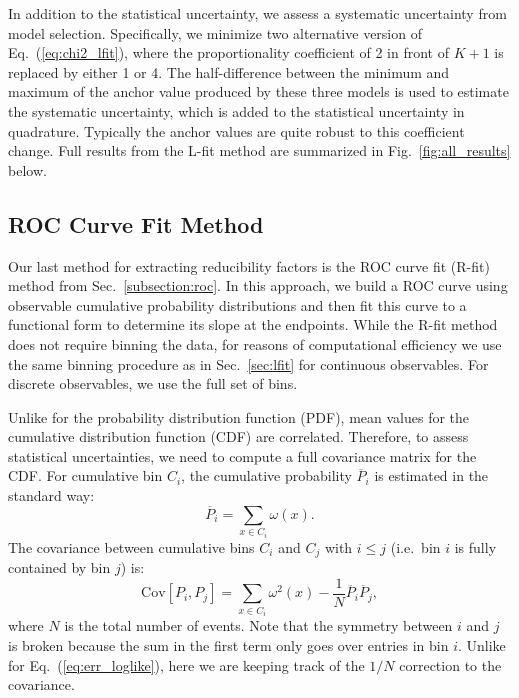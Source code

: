\documentclass[aps,prd,twocolumn,preprintnumbers,nofootinbib,longbibliography,floatfix]{revtex4-1}
\DeclareRobustCommand{\Sec}[1]{Sec.~\ref{#1}}
\DeclareRobustCommand{\Fig}[1]{Fig.~\ref{#1}}
\DeclareRobustCommand{\Eq}[1]{Eq.~(\ref{#1})}
\begin{document}
In addition to the statistical uncertainty, we assess a systematic uncertainty from model selection.
%
Specifically, we minimize two alternative version of \Eq{eq:chi2_lfit}, where the proportionality coefficient of 2 in front of $K+1$ is replaced by either 1 or 4.
%
The half-difference between the minimum and maximum of the anchor value produced by these three models is used to estimate the systematic uncertainty, which is added to the statistical uncertainty in quadrature.
%
Typically the anchor values are quite robust to this coefficient change.
%
Full results from the L-fit method are summarized in \Fig{fig:all_results} below.



\subsection{ROC Curve Fit Method}
\label{sec:roc}






Our last method for extracting reducibility factors is the ROC curve fit (R-fit) method from \Sec{subsection:roc}.
%
In this approach, we build a ROC curve using observable cumulative probability distributions and then fit this curve to a functional form to determine its slope at the endpoints.
%
While the R-fit method does not require binning the data, for reasons of computational efficiency we use the same binning procedure as in \Sec{sec:lfit} for continuous observables.
%
For discrete observables, we use the full set of bins.


Unlike for the probability distribution function (PDF), mean values for the cumulative distribution function (CDF) are correlated. 
%
Therefore, to assess statistical uncertainties, we need to compute a full covariance matrix for the CDF.
%
For cumulative bin $C_i$, the cumulative probability $\overline{P}_i$ is estimated in the standard way: 
%
\begin{equation}
	\label{eq:mean_roc}
	\overline{P}_i = \sum_{x\in C_i}\omega(x).
\end{equation}
%
The covariance between cumulative bins $C_i$ and $C_j$ with $i \le j$ (i.e.~bin $i$ is fully contained by bin $j$) is:
%
\begin{equation}
	\label{eq:cov_roc}
	\text{Cov}[P_i,P_j] = \sum_{x \in C_i} \omega^2(x) - \frac{1}{N} \overline{P}_i \overline{P}_j,
\end{equation}
%
where $N$ is the total number of events.
%
Note that the symmetry between $i$ and $j$ is broken because the sum in the first term only goes over entries in bin $i$.
%
Unlike for \Eq{eq:err_loglike}, here we are keeping track of the $1/N$ correction to the covariance.
\end{document}
